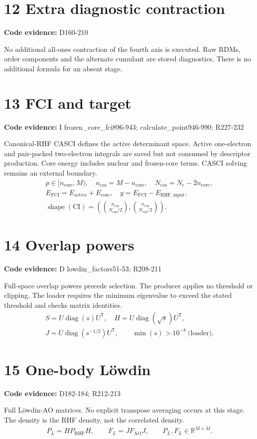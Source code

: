 \documentclass[10pt,a4paper]{article}
\newcommand{\stage}[2]{\section*{#1}\textbf{Code evidence:} #2\par}
\begin{document}
\par\noindent\begin{minipage}{\linewidth}
\stage{12 Extra diagnostic contraction}{D160-210}
No additional all-ones contraction of the fourth axis is executed. Raw RDMs, order components and the alternate cumulant are stored diagnostics. There is no additional formula for an absent stage.
\end{minipage}\par\vspace{4pt}
\par\noindent\begin{minipage}{\linewidth}
\stage{13 FCI and target}{I frozen\_core\_fci896-943; calculate\_point946-990; R227-232}
Canonical-RHF CASCI defines the active determinant space. Active one-electron and pair-packed two-electron integrals are saved but not consumed by descriptor production. Core energy includes nuclear and frozen-core terms. CASCI solving remains an external boundary.
\[
\begin{gathered}
p\in[n_{\mathrm{core}},M),\quad n_{\mathrm{cas}}=M-n_{\mathrm{core}},\quad N_{\mathrm{cas}}=N_e-2n_{\mathrm{core}},\\ E_{\mathrm{FCI}}=E_{\mathrm{active}}+E_{\mathrm{core}},\quad y=E_{\mathrm{FCI}}-E_{\mathrm{RHF,input}},\\ \operatorname{shape}(\mathrm{CI})=\left(\binom{n_{\mathrm{cas}}}{N_{\mathrm{cas}}/2},\binom{n_{\mathrm{cas}}}{N_{\mathrm{cas}}/2}\right).
\end{gathered}
\]
\end{minipage}\par\vspace{4pt}
\par\noindent\begin{minipage}{\linewidth}
\stage{14 Overlap powers}{D lowdin\_factors51-53; R208-211}
Full-space overlap powers precede selection. The producer applies no threshold or clipping. The loader requires the minimum eigenvalue to exceed the stated threshold and checks matrix identities.
\[
\begin{gathered}
S=U\operatorname{diag}(s)U^{\mathsf T},\quad H=U\operatorname{diag}(\sqrt{s})U^{\mathsf T},\\ J=U\operatorname{diag}(s^{-1/2})U^{\mathsf T},\qquad \min(s)>10^{-8}\ \text{(loader)}.
\end{gathered}
\]
\end{minipage}\par\vspace{4pt}
\par\noindent\begin{minipage}{\linewidth}
\stage{15 One-body Löwdin}{D182-184; R212-213}
Full Löwdin-AO matrices. No explicit transpose averaging occurs at this stage. The density is the RHF density, not the correlated density.
\[
\begin{gathered}
P_L=HP_{\mathrm{RHF}}H,\qquad F_L=JF_{\mathrm{AO}}J,\qquad P_L,F_L\in\mathbb R^{M\times M}.
\end{gathered}
\]
\end{minipage}\par\vspace{4pt}
\end{document}
